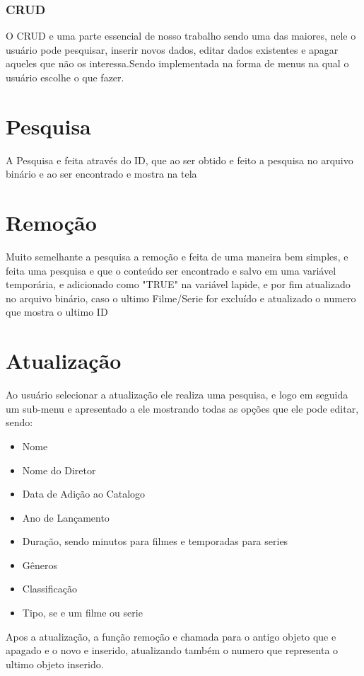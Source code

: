 \documentclass[12pt]{article}
\begin{document}
\subsubsection{CRUD}
O CRUD e uma parte essencial de nosso trabalho sendo uma das maiores, nele o usuário pode pesquisar, inserir novos dados, editar dados existentes e apagar aqueles que não os interessa.Sendo implementada na forma de menus na qual o usuário escolhe o que fazer.

\section*{Pesquisa}
A Pesquisa e feita através do ID, que ao ser obtido e feito a pesquisa no arquivo binário e ao ser encontrado e mostra na tela 

\section*{Remoção}
Muito semelhante a pesquisa a remoção e feita de uma maneira bem simples, e feita uma pesquisa e que o conteúdo ser encontrado e salvo em uma variável temporária, e adicionado como "TRUE" na variável lapide, e por fim atualizado no arquivo binário, caso o ultimo Filme/Serie for excluído e atualizado o numero que mostra o ultimo ID

\section*{Atualização}
Ao usuário selecionar a atualização ele realiza uma pesquisa, e logo em seguida um sub-menu e apresentado a ele mostrando todas as opções que ele pode editar, sendo:

\begin{itemize}
  \item Nome
  \item Nome do Diretor
  \item Data de Adição ao Catalogo
  \item Ano de Lançamento
  \item Duração, sendo minutos para filmes e temporadas para series
  \item Gêneros
  \item Classificação
  \item Tipo, se e um filme ou serie
\end{itemize}

Apos a atualização, a função remoção e chamada para o antigo objeto que e apagado e o novo e inserido, atualizando também o numero que representa o ultimo objeto inserido. 
\end{document}
